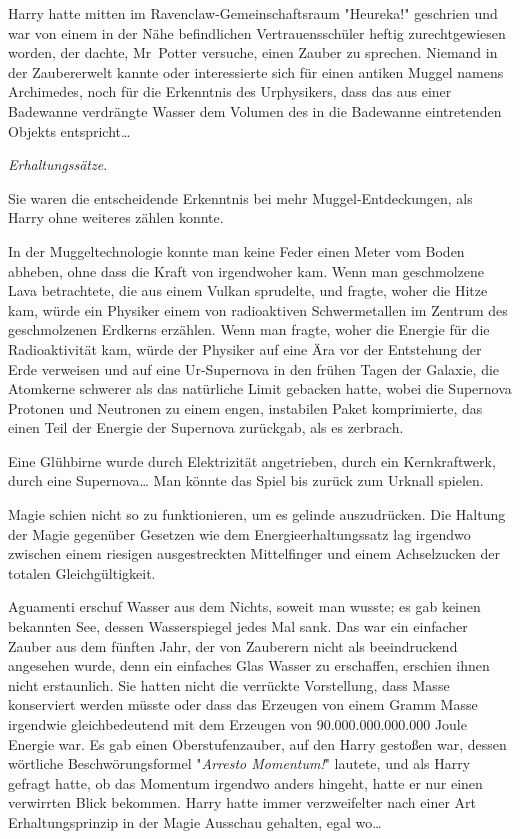 {Harry hatte mitten im Ravenclaw-Gemeinschaftsraum "Heureka!" geschrien und war von einem in der Nähe befindlichen Vertrauensschüler heftig zurechtgewiesen worden, der dachte, Mr~Potter versuche, einen Zauber zu sprechen. Niemand in der Zaubererwelt kannte oder interessierte sich für einen antiken Muggel namens Archimedes, noch für die Erkenntnis des Urphysikers, dass das aus einer Badewanne verdrängte Wasser dem Volumen des in die Badewanne eintretenden Objekts entspricht…

\emph{Erhaltungssätze}.

Sie waren die entscheidende Erkenntnis bei mehr Muggel-Entdeckungen, als Harry ohne weiteres zählen konnte.

In der Muggeltechnologie konnte man keine Feder einen Meter vom Boden abheben, ohne dass die Kraft von irgendwoher kam. Wenn man geschmolzene Lava betrachtete, die aus einem Vulkan sprudelte, und fragte, woher die Hitze kam, würde ein Physiker einem von radioaktiven Schwermetallen im Zentrum des geschmolzenen Erdkerns erzählen. Wenn man fragte, woher die Energie für die Radioaktivität kam, würde der Physiker auf eine Ära vor der Entstehung der Erde verweisen und auf eine Ur-Supernova in den frühen Tagen der Galaxie, die Atomkerne schwerer als das natürliche Limit gebacken hatte, wobei die Supernova Protonen und Neutronen zu einem engen, instabilen Paket komprimierte, das einen Teil der Energie der Supernova zurückgab, als es zerbrach.

Eine Glühbirne wurde durch Elektrizität angetrieben, durch ein Kernkraftwerk, durch eine Supernova… Man könnte das Spiel bis zurück zum Urknall spielen.

Magie schien nicht so zu funktionieren, um es gelinde auszudrücken. Die Haltung der Magie gegenüber Gesetzen wie dem Energieerhaltungssatz lag irgendwo zwischen einem riesigen ausgestreckten Mittelfinger und einem Achselzucken der totalen Gleichgültigkeit.

Aguamenti erschuf Wasser aus dem Nichts, soweit man wusste; es gab keinen bekannten See, dessen Wasserspiegel jedes Mal sank. Das war ein einfacher Zauber aus dem fünften Jahr, der von Zauberern nicht als beeindruckend angesehen wurde, denn ein einfaches Glas Wasser zu erschaffen, erschien ihnen nicht erstaunlich. Sie hatten nicht die verrückte Vorstellung, dass Masse konserviert werden müsste oder dass das Erzeugen von einem Gramm Masse irgendwie gleichbedeutend mit dem Erzeugen von 90.000.000.000.000 Joule Energie war. Es gab einen Oberstufenzauber, auf den Harry gestoßen war, dessen wörtliche Beschwörungsformel "\emph{Arresto Momentum!}" lautete, und als Harry gefragt hatte, ob das Momentum irgendwo anders hingeht, hatte er nur einen verwirrten Blick bekommen. Harry hatte immer verzweifelter nach einer Art Erhaltungsprinzip in der Magie Ausschau gehalten, egal wo…

}
